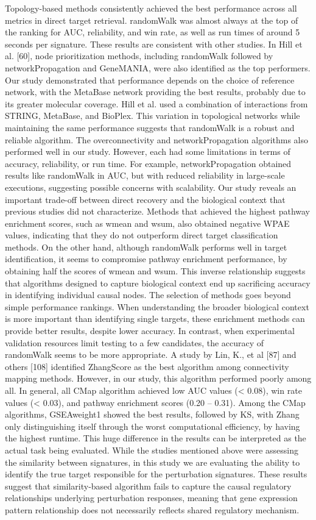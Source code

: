 Topology-based methods consistently achieved the best performance across all metrics in direct target retrieval. randomWalk was almost always at the top of the ranking for AUC, reliability, and win rate, as well as run times of around 5 seconds per signature. These results are consistent with other studies. In Hill et al. [60], node prioritization methods, including randomWalk followed by networkPropagation and GeneMANIA, were also identified as the top performers. Our study demonstrated that performance depends on the choice of reference network, with the MetaBase network providing the best results, probably due to its greater molecular coverage. Hill et al. used a combination of interactions from STRING, MetaBase, and BioPlex.  This variation in topological networks while maintaining the same performance suggests that randomWalk is a robust and reliable algorithm. The overconnectivity and networkPropagation algorithms also performed well in our study. However, each had some limitations in terms of accuracy, reliability, or run time. For example, networkPropagation obtained results like randomWalk in AUC, but with reduced reliability in large-scale executions, suggesting possible concerns with scalability.
Our study reveals an important trade-off between direct recovery and the biological context that previous studies did not characterize. Methods that achieved the highest pathway enrichment scores, such as wmean and wsum, also obtained negative WPAE values, indicating that they do not outperform direct target classification methods. On the other hand, although randomWalk performs well in target identification, it seems to compromise pathway enrichment performance, by obtaining half the scores of wmean and wsum. This inverse relationship suggests that algorithms designed to capture biological context end up sacrificing accuracy in identifying individual causal nodes. The selection of methods goes beyond simple performance rankings. When understanding the broader biological context is more important than identifying single targets, these enrichment methods can provide better results, despite lower accuracy. In contrast, when experimental validation resources limit testing to a few candidates, the accuracy of randomWalk seems to be more appropriate.
A study by Lin, K., et al [87] and others [108] identified ZhangScore as the best algorithm among connectivity mapping methods. However, in our study, this algorithm performed poorly among all. In general, all CMap algorithm achieved low AUC values (< 0.08), win rate values (< 0.03), and pathway enrichment scores (0.20 – 0.31). Among the CMap algorithms, GSEAweight1 showed the best results, followed by KS, with Zhang only distinguishing itself through the worst computational efficiency, by having the highest runtime. This huge difference in the results can be interpreted as the actual task being evaluated. While the studies mentioned above were assessing the similarity between signatures, in this study we are evaluating the ability to identify the true target responsible for the perturbation signatures. These results suggest that similarity-based algorithm fails to capture the causal regulatory relationships underlying perturbation responses, meaning that gene expression pattern relationship does not necessarily reflects shared regulatory mechanism.
